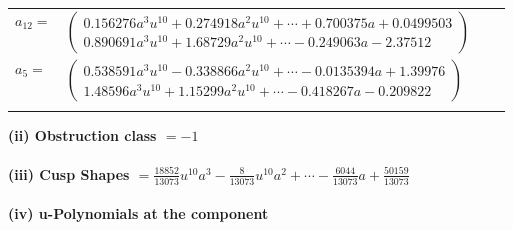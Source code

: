 \documentclass[1p]{elsarticle_modified}
\theoremstyle{definition}
\begin{document}
\begin{tabular}{m{7pt} m{180pt} m{7pt} m{180pt} }
\flushright $a_{12}=$&$\begin{pmatrix}0.156276 a^{3} u^{10}+0.274918 a^{2} u^{10}+\cdots+0.700375 a+0.0499503\\0.890691 a^{3} u^{10}+1.68729 a^{2} u^{10}+\cdots-0.249063 a-2.37512\end{pmatrix}$ \\
\flushright $a_{5}=$&$\begin{pmatrix}0.538591 a^{3} u^{10}-0.338866 a^{2} u^{10}+\cdots-0.0135394 a+1.39976\\1.48596 a^{3} u^{10}+1.15299 a^{2} u^{10}+\cdots-0.418267 a-0.209822\end{pmatrix}$\\&\end{tabular}
\flushleft \textbf{(ii) Obstruction class $= -1$}\\~\\
\flushleft \textbf{(iii) Cusp Shapes $= \frac{18852}{13073} u^{10} a^3-\frac{8}{13073} u^{10} a^2+\cdots-\frac{6044}{13073} a+\frac{50159}{13073}$}\\~\\
\newpage\renewcommand{\arraystretch}{1}
\flushleft \textbf{(iv) u-Polynomials at the component}\newline \\
\end{document}

